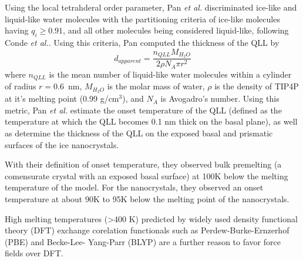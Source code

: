 Using the local tetrahderal order parameter, Pan \textit{et al.}
discriminated ice-like and liquid-like water molecules with the
partitioning criteria of ice-like molecules having $q_{i} \geq 0.91$,
and all other molecules being considered liquid-like, following Conde
\textit{et al.}.\cite{Conde2008} Using this criteria, Pan computed the
thickness of the QLL by
\begin{equation}
d_{apparent} = \frac{n_{QLL}M_{H_{2}O}}{2\rho N_{A} \pi r^{2}}
\end{equation}
where $n_{QLL}$ is the mean number of liquid-like water molecules
within a cylinder of radius $r = 0.6$~nm, $M_{H_{2}O}$ is the molar
mass of water, $\rho$ is the density of TIP4P at it's melting point
(0.99 g/cm$^{3}$\cite{Bluhm2000,Conde2008}), and $N_{A}$ is Avogadro's number.
Using this metric, Pan \textit{et al.} estimate the onset temperature
of the QLL (defined as the temperature at which the QLL becomes 0.1 nm
thick on the basal plane\cite{Conde2008}), as well as determine the thickness
of the QLL on the exposed basal and prismatic surfaces of the ice
nanocrystals. 

With their definition of onset temperature, they observed bulk
premelting (a comensurate crystal with an exposed basal surface) at
100K below the melting temperature of the model. For the nanocrystals,
they observed an onset temperature at about 90K to 95K below the
melting point of the nanocrystals. 

High melting temperatures (>400 K) predicted by widely used density
functional theory (DFT) exchange corelation functionals such as
Perdew-Burke-Ernzerhof (PBE)\cite{Perdew1996} and Becke-Lee- Yang-Parr
(BLYP)\cite{Becke1988,Sprik1996} are a further reason to favor force fields over
DFT.\cite{Yoo2009}





